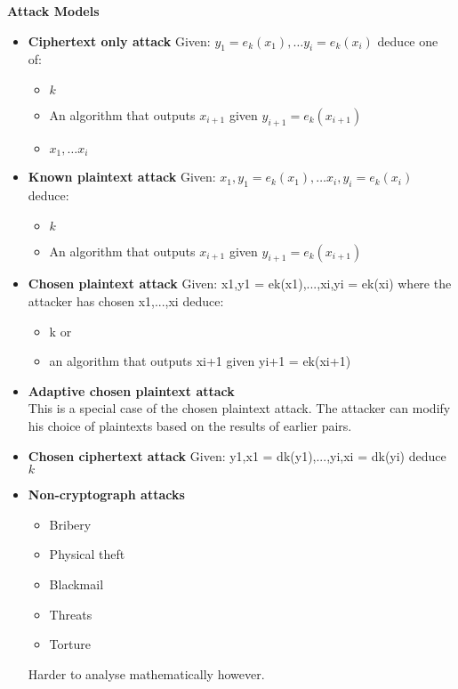\textbf{Attack Models}\\
\begin{itemize}
    \item \textbf{Ciphertext only attack}
        Given: $y_1 = e_k(x_1),\dots y_i = e_k(x_i)$ deduce one of:
        \begin{itemize}
            \item $k$
            \item An algorithm that outputs $x_{i+1}$ given $y_{i+1} = e_k(x_{i+1})$
            \item $x_1,\dots x_i$
        \end{itemize}
    \item \textbf{Known plaintext attack}
        Given: $x_1, y_1 = e_k(x_1),\dots x_i,y_i = e_k(x_i)$ deduce:
        \begin{itemize}
            \item $k$
            \item An algorithm that outputs $x_{i+1}$ given $y_{i+1} = e_k(x_{i+1})$
        \end{itemize}
    \item \textbf{Chosen plaintext attack}
        Given: x1,y1 = ek(x1),...,xi,yi = ek(xi) where the attacker has chosen x1,...,xi deduce:
        \begin{itemize}
            \item k or
            \item an algorithm that outputs xi+1 given yi+1 = ek(xi+1)
        \end{itemize}
    \item \textbf{Adaptive chosen plaintext attack}\\
        This is a special case of the chosen plaintext attack.
        The attacker can modify his choice of plaintexts based on the results of earlier pairs.
    \item \textbf{Chosen ciphertext attack}
        Given: y1,x1 = dk(y1),...,yi,xi = dk(yi) deduce $k$
    \item \textbf{Non-cryptograph attacks}
        \begin{itemize}
            \item Bribery
            \item Physical theft
            \item Blackmail
            \item Threats
            \item Torture
        \end{itemize}
        Harder to analyse mathematically however.
\end{itemize}

